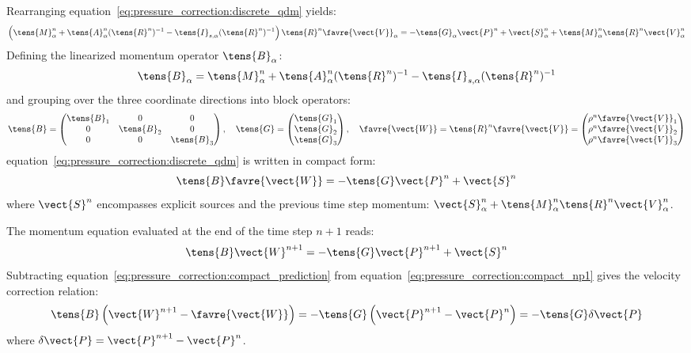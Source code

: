 Rearranging equation~\eqref{eq:pressure_correction:discrete_qdm} yields:
\begin{equation}
  \left( \tens{M}_\alpha^n + \tens{A}_\alpha^n (\tens{R}^n)^{-1}
  - \tens{I}_{s,\alpha} (\tens{R}^n)^{-1} \right) \tens{R}^n \favre{\vect{V}}_\alpha
  = - \tens{G}_\alpha \vect{P}^n + \vect{S}_\alpha^n
  + \tens{M}_\alpha^n \tens{R}^n \vect{V}_\alpha^n
\end{equation}
Defining the linearized momentum operator $\tens{B}_\alpha$:
\begin{equation}
  \tens{B}_\alpha = \tens{M}_\alpha^n + \tens{A}_\alpha^n (\tens{R}^n)^{-1}
  - \tens{I}_{s,\alpha} (\tens{R}^n)^{-1}
\end{equation}
and grouping over the three coordinate directions into block operators:
\begin{equation}
  \tens{B} = \begin{pmatrix} \tens{B}_1 & 0 & 0 \\ 0 & \tens{B}_2 & 0 \\ 0 & 0 & \tens{B}_3 \end{pmatrix},
  \quad
  \tens{G} = \begin{pmatrix} \tens{G}_1 \\ \tens{G}_2 \\ \tens{G}_3 \end{pmatrix},
  \quad
  \favre{\vect{W}} = \tens{R}^n \favre{\vect{V}} = \begin{pmatrix} \rho^n \favre{\vect{V}}_1 \\ \rho^n \favre{\vect{V}}_2 \\ \rho^n \favre{\vect{V}}_3 \end{pmatrix}
\end{equation}
equation~\eqref{eq:pressure_correction:discrete_qdm} is written in compact form:
\begin{equation}
  \tens{B} \favre{\vect{W}} = - \tens{G} \vect{P}^n + \vect{S}^n
  \label{eq:pressure_correction:compact_prediction}
\end{equation}
where $\vect{S}^n$ encompasses explicit sources and the previous time step momentum:
$\vect{S}_\alpha^n + \tens{M}_\alpha^n \tens{R}^n \vect{V}_\alpha^n$.

The momentum equation evaluated at the end of the time step $n+1$ reads:
\begin{equation}
  \tens{B} \vect{W}^{n+1} = - \tens{G} \vect{P}^{n+1} + \vect{S}^n
  \label{eq:pressure_correction:compact_np1}
\end{equation}
Subtracting equation~\eqref{eq:pressure_correction:compact_prediction} from
equation~\eqref{eq:pressure_correction:compact_np1} gives the velocity correction
relation:
\begin{equation}
  \tens{B} \left( \vect{W}^{n+1} - \favre{\vect{W}} \right) = - \tens{G} \left( \vect{P}^{n+1} - \vect{P}^n \right) = - \tens{G} \delta \vect{P}
  \label{eq:pressure_correction:momentum_difference}
\end{equation}
where $\delta \vect{P} = \vect{P}^{n+1} - \vect{P}^n$.

